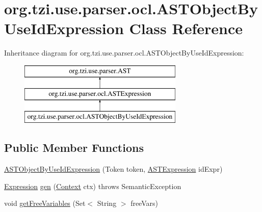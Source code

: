 \hypertarget{classorg_1_1tzi_1_1use_1_1parser_1_1ocl_1_1_a_s_t_object_by_use_id_expression}{\section{org.\-tzi.\-use.\-parser.\-ocl.\-A\-S\-T\-Object\-By\-Use\-Id\-Expression Class Reference}
\label{classorg_1_1tzi_1_1use_1_1parser_1_1ocl_1_1_a_s_t_object_by_use_id_expression}
}
Inheritance diagram for org.\-tzi.\-use.\-parser.\-ocl.\-A\-S\-T\-Object\-By\-Use\-Id\-Expression\-:\begin{figure}[H]
\begin{center}
\leavevmode
\includegraphics[height=3.000000cm]{classorg_1_1tzi_1_1use_1_1parser_1_1ocl_1_1_a_s_t_object_by_use_id_expression}
\end{center}
\end{figure}
\subsection*{Public Member Functions}
\begin{DoxyCompactItemize}
\item 
\hyperlink{classorg_1_1tzi_1_1use_1_1parser_1_1ocl_1_1_a_s_t_object_by_use_id_expression_abc0a21c9423322c40c73b304941df33f}{A\-S\-T\-Object\-By\-Use\-Id\-Expression} (Token token, \hyperlink{classorg_1_1tzi_1_1use_1_1parser_1_1ocl_1_1_a_s_t_expression}{A\-S\-T\-Expression} id\-Expr)
\item 
\hyperlink{classorg_1_1tzi_1_1use_1_1uml_1_1ocl_1_1expr_1_1_expression}{Expression} \hyperlink{classorg_1_1tzi_1_1use_1_1parser_1_1ocl_1_1_a_s_t_object_by_use_id_expression_a64771b07fda919158c9cd59d6eaa37f8}{gen} (\hyperlink{classorg_1_1tzi_1_1use_1_1parser_1_1_context}{Context} ctx)  throws Semantic\-Exception 
\item 
void \hyperlink{classorg_1_1tzi_1_1use_1_1parser_1_1ocl_1_1_a_s_t_object_by_use_id_expression_a15a2d17bd4b7af4793a8c8af651e0d3f}{get\-Free\-Variables} (Set$<$ String $>$ free\-Vars)
\end{DoxyCompactItemize}
